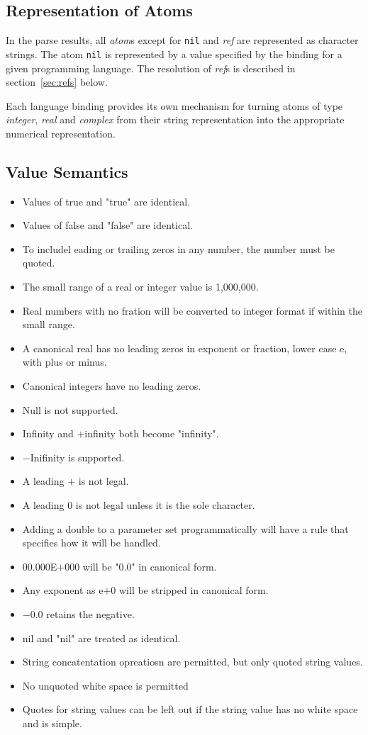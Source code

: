 \documentclass{memarticle}
\begin{document}
	\subsection{Representation of Atoms}
		In the parse results,
		all \emph{atom}s
		except for \texttt{nil} and \emph{ref}
		are represented
		as character strings.
		The atom \texttt{nil} is represented by a 
		value specified by the binding for a given programming language.
		The resolution of \emph{ref}s is described in section~\ref{sec:refs} below.
		\vspace{1mm}
		\par
		Each language binding
		provides its own mechanism
		for turning atoms of type \emph{integer}, \emph{real} and \emph{complex}
		from their string representation
		into the appropriate numerical representation.
	\subsection{Value Semantics}
		\begin{itemize}
			\item Values of true and "true" are identical.
			\item Values of false and "false" are identical.
			\item To includel eading or trailing zeros in any number,
					the number must be quoted.
			\item The small range of a real or integer value is 1,000,000.
			\item Real numbers with no fration will be converted to integer format
					if within the small range.
			\item A canonical real has no leading zeros in exponent or fraction, lower case e, with plus or minus.
			\item Canonical integers have no leading zeros.
			\item Null is not supported.
			\item Infinity and $+$infinity both become "infinity".
			\item $-$Inifinity is supported.
			\item A leading $+$ is not legal.
			\item A leading 0 is not legal unless it is the sole character.
			\item Adding a double to a parameter set programmatically will have a rule that specifies how it will be handled.
			\item 00.000E$+$000 will be "0.0" in canonical form.
			\item Any exponent as e$+$0 will be stripped in canonical form.
			\item $-$0.0 retains the negative.
			\item nil and "nil" are treated as identical.
			\item String concatentation opreatiosn are permitted, but only quoted string values.
			\item No unquoted white space is permitted
			\item Quotes for string values can be left out if the string value has no white space and is simple.
		\end{itemize}
\end{document}
